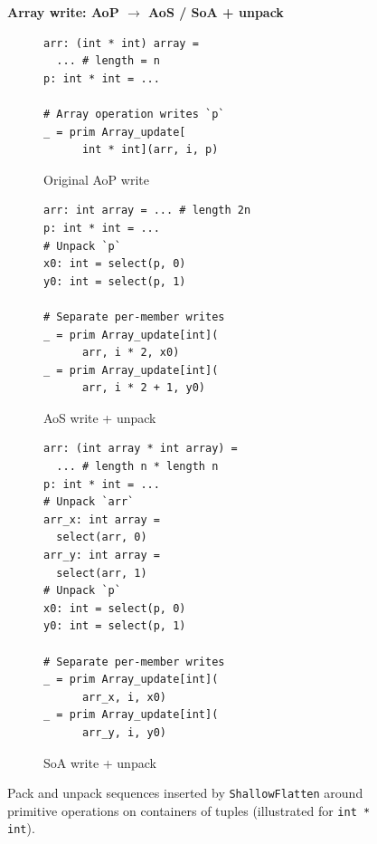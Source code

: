 \begin{figure}[htbp]
  \vspace{3mm}

  {\centering\textbf{\footnotesize Array write: AoP $\to$ AoS / SoA + unpack}\par}\vspace{1mm}
  \begin{subfigure}[t]{0.32\textwidth}
    \caption{Original AoP write}
    \label{fig:unpack_write_aop}
    \label{fig:unpack_write_example}
    \vspace{1mm}
\begin{verbatim}
arr: (int * int) array =
  ... # length = n
p: int * int = ...

# Array operation writes `p`
_ = prim Array_update[
      int * int](arr, i, p)
\end{verbatim}
  \end{subfigure}\hfill
  \begin{subfigure}[t]{0.32\textwidth}
    \caption{AoS write + unpack}
    \label{fig:unpack_write_aos}
    \vspace{1mm}
\begin{verbatim}
arr: int array = ... # length 2n
p: int * int = ...
# Unpack `p`
x0: int = select(p, 0)
y0: int = select(p, 1)

# Separate per-member writes
_ = prim Array_update[int](
      arr, i * 2, x0)
_ = prim Array_update[int](
      arr, i * 2 + 1, y0)
\end{verbatim}
  \end{subfigure}\hfill
  \begin{subfigure}[t]{0.32\textwidth}
    \caption{SoA write + unpack}
    \label{fig:unpack_write_soa}
    \vspace{1mm}
\begin{verbatim}
arr: (int array * int array) =
  ... # length n * length n
p: int * int = ...
# Unpack `arr`
arr_x: int array =
  select(arr, 0)
arr_y: int array =
  select(arr, 1)
# Unpack `p`
x0: int = select(p, 0)
y0: int = select(p, 1)

# Separate per-member writes
_ = prim Array_update[int](
      arr_x, i, x0)
_ = prim Array_update[int](
      arr_y, i, y0)
\end{verbatim}
  \end{subfigure}
  \caption{Pack and unpack sequences inserted by \texttt{ShallowFlatten} around primitive operations on containers of tuples (illustrated for \texttt{int * int}).}
  \label{fig:pack_unpack_example}
\end{figure}



